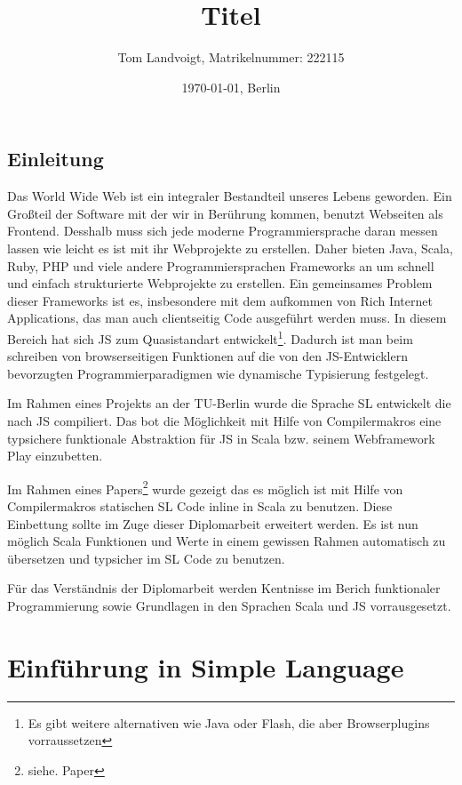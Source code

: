 \documentclass[12pt]{scrreprt}
\title{Titel}
\author{Tom Landvoigt, Matrikelnummer: 222115}
\date{\today{}, Berlin}
\begin{document}
\maketitle
\tableofcontents

\newpage

\lstset{basicstyle=\ttfamily\scriptsize, numbers=left, numberstyle=\tiny}

\section{Einleitung}

Das World Wide Web ist ein integraler Bestandteil unseres Lebens geworden. Ein Großteil der Software mit der wir in Berührung kommen, benutzt Webseiten als Frontend. Desshalb muss sich jede moderne Programmiersprache daran messen lassen wie leicht es ist mit ihr Webprojekte zu erstellen. Daher bieten Java, Scala, Ruby, PHP und viele andere Programmiersprachen Frameworks an um schnell und einfach strukturierte Webprojekte zu erstellen. Ein gemeinsames Problem dieser Frameworks ist es, insbesondere mit dem aufkommen von Rich Internet Applications, das man auch clientseitig Code ausgeführt werden muss. In diesem Bereich hat sich \ac{JS} zum Quasistandart entwickelt\footnote{Es gibt weitere alternativen wie Java oder Flash, die aber Browserplugins vorraussetzen}. Dadurch ist man beim schreiben von browserseitigen Funktionen auf die von den \ac{JS}-Entwicklern bevorzugten Programmierparadigmen wie dynamische Typisierung festgelegt.

Im Rahmen eines Projekts an der TU-Berlin wurde die Sprache \ac{SL} entwickelt die nach \ac{JS} compiliert. Das bot die Möglichkeit mit Hilfe von Compilermakros eine typsichere funktionale Abstraktion für \ac{JS} in Scala bzw. seinem Webframework Play einzubetten.

Im Rahmen eines Papers\footnote{siehe. Paper} wurde gezeigt das es möglich ist mit Hilfe von Compilermakros statischen \ac{SL} Code inline in Scala zu benutzen. Diese Einbettung sollte im Zuge dieser Diplomarbeit erweitert werden. Es ist nun möglich Scala Funktionen und Werte in einem gewissen Rahmen automatisch zu übersetzen und typsicher im \ac{SL} Code zu benutzen.

Für das Verständnis der Diplomarbeit werden Kentnisse im Berich funktionaler Programmierung sowie Grundlagen in den Sprachen Scala und \ac{JS} vorrausgesetzt.

\chapter{ Einführung in Simple Language}
\end{document}
